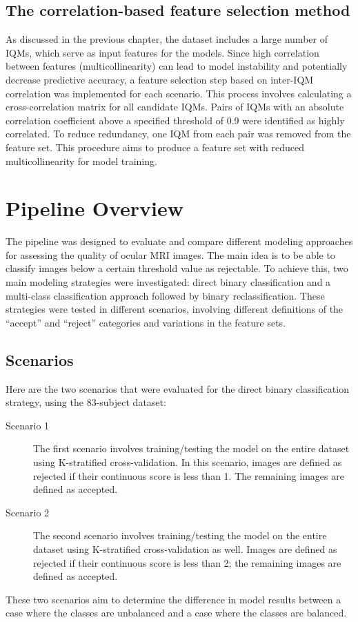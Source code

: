 \subsection{The correlation-based feature selection method}
\label{ssec:feature_preparation_methods}
As discussed in the previous chapter, the dataset includes a large number of IQMs, which serve as input features for the models. Since high correlation between features (multicollinearity) can lead to model instability and potentially decrease predictive accuracy, a feature selection step based on inter-IQM correlation was implemented for each scenario. This process involves calculating a cross-correlation matrix for all candidate IQMs. Pairs of IQMs with an absolute correlation coefficient above a specified threshold of 0.9 were identified as highly correlated. To reduce redundancy, one IQM from each pair was removed from the feature set. This procedure aims to produce a feature set with reduced multicollinearity for model training.

\section{Pipeline Overview}
\label{sec:pipeline_overview}
The pipeline was designed to evaluate and compare different modeling approaches for assessing the quality of ocular MRI images. The main idea is to be able to classify images below a certain threshold value as rejectable. To achieve this, two main modeling strategies were investigated: direct binary classification and a multi-class classification approach followed by binary reclassification. These strategies were tested in different scenarios, involving different definitions of the “accept” and “reject” categories and variations in the feature sets.

\subsection{Scenarios}
\label{ssec:scenarios_methods} %

Here are the two scenarios that were evaluated for the direct binary classification strategy, using the 83-subject dataset:
\begin{description}
    \item[Scenario 1] The first scenario involves training/testing the model on the entire dataset using K-stratified cross-validation. In this scenario, images are defined as rejected if their continuous score is less than 1. The remaining images are defined as accepted.
    \item[Scenario 2] The second scenario involves training/testing the model on the entire dataset using K-stratified cross-validation as well. Images are defined as rejected if their continuous score is less than 2; the remaining images are defined as accepted.
\end{description}
These two scenarios aim to determine the difference in model results between a case where the classes are unbalanced and a case where the classes are balanced.

